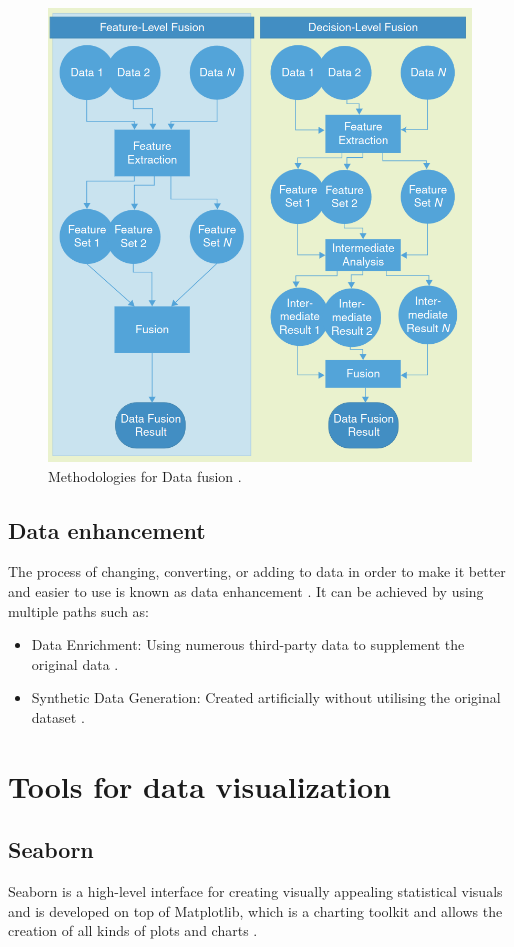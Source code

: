 \begin{figure}[h!]
 \centering
  \includegraphics[height=0.7\linewidth]{frontmatter/imgs/ffdf2.png}
  \caption{Methodologies for Data fusion \cite{articleDataFusion}.}
  \label{fig:meth:data_fusion}
\end{figure}

\subsection{Data enhancement} 
The process of changing, converting, or adding to data in order to make it better and easier to use is known as data enhancement \cite{clickworker2021}. 
It can be achieved by using multiple paths such as:
\begin{itemize}
    \item Data Enrichment: Using numerous third-party data to supplement the original data \cite{mparticle_data_enrichment}.
    \item Synthetic Data Generation: Created artificially without utilising the original dataset \cite{awan2023complete_guide_data_augmentation}.
\end{itemize}



\section{Tools for data visualization}

\subsection{Seaborn}
\label{dv_seabon}
Seaborn is a high-level interface for creating visually appealing statistical visuals and is developed on top of Matplotlib, which is a charting toolkit and allows the creation of all kinds of plots and charts \cite{seaborn}\cite{matplotlib}.

